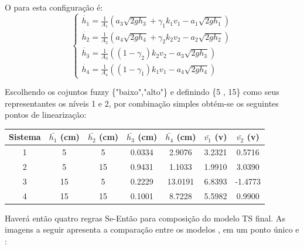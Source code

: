 O  para esta configuração é:
\begin{equation}
\begin{cases}
\dot{h_{1}} = \frac{1}{A_{1}}(a_{3}\sqrt{2gh_{3}} + \gamma_{1}k_{1}v_{1} - a_{1}\sqrt{2gh_{1}})\\

\dot{h_{2}} = \frac{1}{A_{2}}(a_{4}\sqrt{2gh_{4}} + \gamma_{2}k_{2}v_{2} - a_{2}\sqrt{2gh_{2}})\\

\dot{h_{3}} = \frac{1}{A_{3}}((1 - \gamma_{2})k_{2}v_{2} - a_{3}\sqrt{2gh_{3}})\\

\dot{h_{4}} = \frac{1}{A_{4}}((1 - \gamma_{1})k_{1}v_{1} - a_{4}\sqrt{2gh_{4}})
\end{cases}
\label{eqFMNL}
\end{equation}

Escolhendo os cojuntos fuzzy \{"baixo","alto"\} e definindo \{5 , 15\} como seus representantes os níveis 1 e 2, por combinação simples obtém-se os seguintes pontos de linearização:
\begin{center}
	\begin{tabular}{|c|c|c|c|c|c|c|}
		\hline
		Sistema & $\bar{h_1}$ (cm) & $\bar{h_2}$ (cm) & $\bar{h_3}$ (cm) & $\bar{h_4}$ (cm) & $\bar{v_1}$ (v) & $\bar{v_2}$ (v) \\ \hline
		1 & 5 & 5 & 0.0334 & 2.9076 & 3.2321 & 0.5716 \\ \hline
		2 & 5 & 15 & 0.9431 & 1.1033 & 1.9910 & 3.0390 \\ \hline
		3 & 15 & 5 & 0.2229 & 13.0191 & 6.8393 & -1.4773 \\ \hline
		4 & 15 & 15 & 0.1001 & 8.7228 & 5.5982 & 0.9900 \\	\hline
	\end{tabular}
\end{center}

Haverá então quatro regras Se-Então para composição do modelo TS final. As imagens a seguir apresenta a comparação entre os modelos ,  em um ponto único e :

